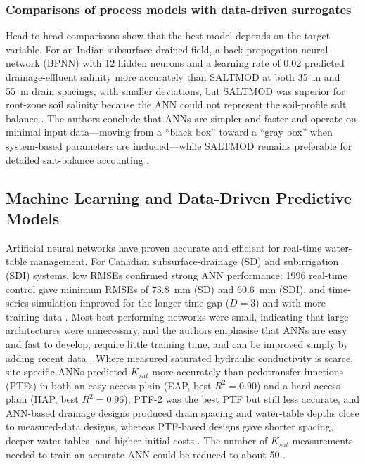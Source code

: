 \documentclass[11pt]{article}
\begin{document}
\subsubsection{Comparisons of process models with data-driven surrogates}

Head-to-head comparisons show that the best model depends on the target
variable. For an Indian subsurface-drained field, a back-propagation neural
network (BPNN) with 12 hidden neurons and a learning rate of 0.02 predicted
drainage-effluent salinity more accurately than SALTMOD at both 35~m and 55~m
drain spacings, with smaller deviations, but SALTMOD was superior for root-zone
soil salinity because the ANN could not represent the soil-profile salt balance
\parencite{Sarangi2006}. The authors conclude that ANNs are simpler and faster
and operate on minimal input data---moving from a ``black box'' toward a ``gray
box'' when system-based parameters are included---while SALTMOD remains
preferable for detailed salt-balance accounting \parencite{Sarangi2006}.

\subsection{Machine Learning and Data-Driven Predictive Models}

Artificial neural networks have proven accurate and efficient for real-time
water-table management. For Canadian subsurface-drainage (SD) and
subirrigation (SDI) systems, low RMSEs confirmed strong ANN performance: 1996
real-time control gave minimum RMSEs of 73.8~mm (SD) and 60.6~mm (SDI), and
time-series simulation improved for the longer time gap ($D=3$) and with more
training data \parencite{Yang2000}. Most best-performing networks were small,
indicating that large architectures were unnecessary, and the authors emphasise
that ANNs are easy and fast to develop, require little training time, and can be
improved simply by adding recent data \parencite{Yang2000}. Where measured
saturated hydraulic conductivity is scarce, site-specific ANNs predicted $K_{sat}$
more accurately than pedotransfer functions (PTFs) in both an easy-access plain
(EAP, best $R^2=0.90$) and a hard-access plain (HAP, best $R^2=0.96$); PTF-2 was
the best PTF but still less accurate, and ANN-based drainage designs produced
drain spacing and water-table depths close to measured-data designs, whereas
PTF-based designs gave shorter spacing, deeper water tables, and higher initial
costs \parencite{Ellafi2021}. The number of $K_{sat}$ measurements needed to
train an accurate ANN could be reduced to about 50 \parencite{Ellafi2021}.
\end{document}
